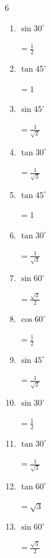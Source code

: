 \begin{multicols}{6}
\begin{enumerate}
        $\displaystyle =1$

  \item $\displaystyle \sin{30^\circ}$

        $\displaystyle =\frac{1}{2}$

  \item $\displaystyle \tan{45^\circ}$

        $\displaystyle =1$

  \item $\displaystyle \sin{45^\circ}$

        $\displaystyle =\frac{1}{\sqrt{2}}$

  \item $\displaystyle \tan{30^\circ}$

        $\displaystyle =\frac{1}{\sqrt{3}}$

  \item $\displaystyle \tan{45^\circ}$

        $\displaystyle =1$

  \item $\displaystyle \tan{30^\circ}$

        $\displaystyle =\frac{1}{\sqrt{3}}$

  \item $\displaystyle \sin{60^\circ}$

        $\displaystyle =\frac{\sqrt{3}}{2}$

  \item $\displaystyle \cos{60^\circ}$

        $\displaystyle =\frac{1}{2}$

  \item $\displaystyle \sin{45^\circ}$

        $\displaystyle =\frac{1}{\sqrt{2}}$

  \item $\displaystyle \sin{30^\circ}$

        $\displaystyle =\frac{1}{2}$

  \item $\displaystyle \tan{30^\circ}$

        $\displaystyle =\frac{1}{\sqrt{3}}$

  \item $\displaystyle \tan{60^\circ}$

        $\displaystyle =\sqrt{3}$

  \item $\displaystyle \sin{60^\circ}$

        $\displaystyle =\frac{\sqrt{3}}{2}$


\end{enumerate}
\end{multicols}
